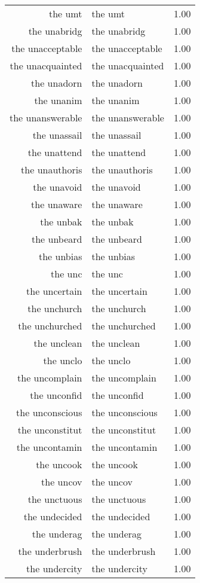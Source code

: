 \begin{table}[ht]
\begin{tabular}{rlr}
  the umt & the umt & 1.00 \\ 
  the unabridg & the unabridg & 1.00 \\ 
  the unacceptable & the unacceptable & 1.00 \\ 
  the unacquainted & the unacquainted & 1.00 \\ 
  the unadorn & the unadorn & 1.00 \\ 
  the unanim & the unanim & 1.00 \\ 
  the unanswerable & the unanswerable & 1.00 \\ 
  the unassail & the unassail & 1.00 \\ 
  the unattend & the unattend & 1.00 \\ 
  the unauthoris & the unauthoris & 1.00 \\ 
  the unavoid & the unavoid & 1.00 \\ 
  the unaware & the unaware & 1.00 \\ 
  the unbak & the unbak & 1.00 \\ 
  the unbeard & the unbeard & 1.00 \\ 
  the unbias & the unbias & 1.00 \\ 
  the unc & the unc & 1.00 \\ 
  the uncertain & the uncertain & 1.00 \\ 
  the unchurch & the unchurch & 1.00 \\ 
  the unchurched & the unchurched & 1.00 \\ 
  the unclean & the unclean & 1.00 \\ 
  the unclo & the unclo & 1.00 \\ 
  the uncomplain & the uncomplain & 1.00 \\ 
  the unconfid & the unconfid & 1.00 \\ 
  the unconscious & the unconscious & 1.00 \\ 
  the unconstitut & the unconstitut & 1.00 \\ 
  the uncontamin & the uncontamin & 1.00 \\ 
  the uncook & the uncook & 1.00 \\ 
  the uncov & the uncov & 1.00 \\ 
  the unctuous & the unctuous & 1.00 \\ 
  the undecided & the undecided & 1.00 \\ 
  the underag & the underag & 1.00 \\ 
  the underbrush & the underbrush & 1.00 \\ 
  the undercity & the undercity & 1.00 \\ 

\end{tabular}
\end{table}
